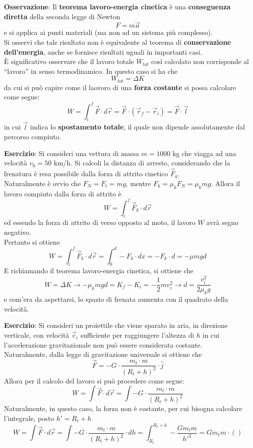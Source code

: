 \documentclass[a4paper]{extarticle}
\newcommand{\quotes}[1]{``#1''}
\begin{document}
\vspace{1em}
\noindent
\textbf{Osservazione}: Il \textbf{teorema lavoro-energia cinetica} è una \textbf{conseguenza diretta} della seconda legge di Newton
\[F = m \vec a\]
e si applica ai punti materiali (ma non ad un sistema più complesso).\\
Si osservi che tale risultato non è equivalente al teorema di \textbf{conservazione dell'energia}, anche se fornisce risultati uguali in importanti casi.\\
È significativo osservare che il lavoro totale $W_{tot}$ così calcolato non corrisponde al \quotes{lavoro} in senso termodinamico. In questo caso si ha che
\[W_{tot} = \Delta K\]
da cui si può capire come il laovoro di una \textbf{forza costante} si possa calcolare come segue:
\[W = \int_i^f \vec F \cdot d \vec r = \vec F \cdot (\vec r_f - \vec r_i) = \vec F \cdot \vec l\]
in cui $\vec l$ indica lo \textbf{spostamento totale}, il quale non dipende assolutamente dal percorso compiuto.

\vspace{1em}
\noindent
\textbf{Esercizio}: Si consideri una vettura di massa $m=1000$ kg che viagga ad una velocità $v_0=50$ km/h. Si calcoli la distanza di arresto, considerando che la frenatura è resa possibile dalla forza di attrito cinetico $\vec F_k$.\\
Naturalmente è ovvio che $F_N=F_t=mg$, mentre $F_k=\mu_k F_N=\mu_k mg$. Allora il lavoro compiuto dalla forza di attrito è
\[W = \int_i^f \vec F_k \cdot d \vec r\]
ed essendo la forza di attrito di verso opposto al moto, il lavoro $W$ avrà segno negativo.\\
Pertanto si ottiene
\[W = \int_i^f \vec F_k \cdot d \vec r = \int_0^d -F_k \cdot dx = -F_k \cdot d = -\mu m g d\]
E richiamando il teorema lavoro-energia cinetica, si ottiene che
\[W=\Delta K \longrightarrow -\mu_k m g d = K_f-K_i=-\frac{1}{2}mv_i^2\longrightarrow d=\frac{v_i^2}{2\mu_k g}\]
e com'era da aspettarsi, lo spazio di frenata aumenta con il quadrato della velocità.

\vspace{1em}
\noindent
\textbf{Esercizio}: Si consideri un proiettile che viene sparato in aria, in direzione verticale, con velocità $\vec v_i$ sufficiente per raggiungere l'altezza di $h$ in cui l'accelerazione gravitazionale non può essere considerata costante.\\
Naturalmente, dalla legge di gravitazione universale si ottiene che
\[\vec F = - G \cdot \frac{m_t \cdot m}{(R_t + h)^2} \cdot \hat{j}\]
Allora per il calcolo del lavoro si può procedere come segue:
\[W=\int \vec F \cdot d \vec r = \int -G \cdot \frac{m_t \cdot m}{(R_t + h)^2}\]
Naturalmente, in questo caso, la forza non è costante, per cui bisogna calcolare l'integrale, posto $h'=R_t+h$
\[W=\int \vec F \cdot d \vec r = \int -G \cdot \frac{m_t \cdot m}{(R_t + h)^2} \cdot dh = \int_{R_t}^{R_t+h} - \frac{G m_t m}{{h'}^2} = G m_t m \cdot \left(\right)\]
\end{document}
